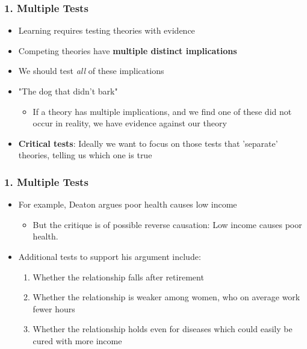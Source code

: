 \documentclass[xcolor=x11names,compress]{beamer}\usepackage[]{graphicx}\usepackage[]{color}
\renewcommand{\(}{\begin{columns}}
\renewcommand{\)}{\end{columns}}
\newcommand{\<}[1]{\begin{column}{#1}}
\renewcommand{\>}{\end{column}}
\begin{document}
\begin{frame}
\frametitle{1. Multiple Tests}
\begin{itemize}
\item Learning requires testing theories with evidence
\pause
\item Competing theories have \textbf{multiple distinct implications}
\pause
\item We should test \textit{all} of these implications
\item "The dog that didn't bark"
\pause
\begin{itemize}
\item If a theory has multiple implications, and we find one of these did not occur in reality, we have evidence against our theory
\pause
\end{itemize}
\item \textbf{Critical tests}: Ideally we want to focus on those tests that 'separate' theories, telling us which one is true
\end{itemize}
\end{frame}

\begin{frame}
\frametitle{1. Multiple Tests}
\begin{itemize}
\item For example, Deaton argues poor health causes low income
\pause
\begin{itemize}
\item But the critique is of possible reverse causation: Low income causes poor health.
\pause
\end{itemize}
\item Additional tests to support his argument include:
\pause
\begin{enumerate}
\item Whether the relationship falls after retirement
\pause
\item Whether the relationship is weaker among women, who on average work fewer hours
\pause
\item Whether the relationship holds even for diseases which could easily be cured with more income
\end{enumerate}
\end{itemize}
\end{frame}
\end{document}
